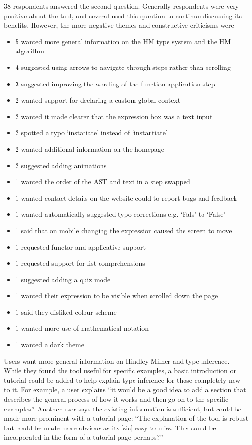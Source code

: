 \documentclass[a4paper,fleqn,oneside,12pt]{report}
\begin{document}
38 respondents answered the second question. Generally respondents were very positive about the tool, and several used this question to continue discussing its benefits. However, the more negative themes and constructive criticisms were:
\begin{itemize}
  \item 5 wanted more general information on the HM type system and the HM algorithm
  \item 4 suggested using arrows to navigate through steps rather than scrolling
  \item 3 suggested improving the wording of the function application step
  \item 2 wanted support for declaring a custom global context
  \item 2 wanted it made clearer that the expression box was a text input
  \item 2 spotted a typo ‘instatiate’ instead of ‘instantiate’
  \item 2 wanted additional information on the homepage
  \item 2 suggested adding animations
  \item 1 wanted the order of the AST and text in a step swapped
  \item 1 wanted contact details on the website could to report bugs and feedback
  \item 1 wanted automatically suggested typo corrections e.g. ‘Fals’ to ‘False’
  \item 1 said that on mobile changing the expression caused the screen to move
  \item 1 requested functor and applicative support
  \item 1 requested support for list comprehensions
  \item 1 suggested adding a quiz mode
  \item 1 wanted their expression to be visible when scrolled down the page
  \item 1 said they disliked colour scheme
  \item 1 wanted more use of mathematical notation
  \item 1 wanted a dark theme
\end{itemize}

Users want more general information on Hindley-Milner and type inference. While they found the tool useful for specific examples, a basic introduction or tutorial could be added to help explain type inference for those completely new to it. For example, a user explains “it would be a good idea to add a section that describes the general process of how it works and then go on to the specific examples”. Another user says the existing information is sufficient, but could be made more prominent with a tutorial page: “The explanation of the tool is robust but could be made more obvious as its [sic] easy to miss. This could be incorporated in the form of a tutorial page perhaps?”
\end{document}

